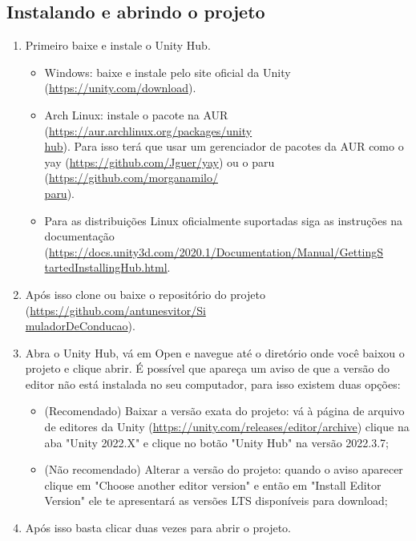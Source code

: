 \begin{apendicesenv}
\subsection*{Instalando e abrindo o projeto}

 \begin{enumerate}
    \item Primeiro baixe e instale o Unity Hub.
    \begin{itemize}
        \item Windows: baixe e instale pelo site oficial da Unity (\href{https://unity.com/download}{https://unity.com/download}).
        \item Arch Linux: instale o pacote na AUR (\href{https://aur.archlinux.org/packages/unityhub}{https://aur.archlinux.org/packages/unity\\hub}). Para isso terá que usar um gerenciador de pacotes da AUR como o yay (\href{https://github.com/Jguer/yay}{https://github.com/Jguer/yay}) ou o paru (\href{https://github.com/morganamilo/paru}{https://github.com/morganamilo/\\paru}).
        \item Para as distribuições Linux oficialmente suportadas siga as instruções na documentação (\href{https://docs.unity3d.com/2020.1/Documentation/Manual/GettingStartedInstallingHub.html}{https://docs.unity3d.com/2020.1/Documentation/Manual/GettingS\\tartedInstallingHub.html}.
    \end{itemize}
    \item Após isso clone ou baixe o repositório do projeto (\href{https://github.com/antunesvitor/SimuladorDeConducao}{https://github.com/antunesvitor/Si\\muladorDeConducao}).
    \item Abra o Unity Hub, vá em Open e navegue até o diretório onde você baixou o projeto e clique abrir. É possível que apareça um aviso de que a versão do editor não está instalada no seu computador, para isso existem duas opções:
    \begin{itemize}
        \item (Recomendado) Baixar a versão exata do projeto: vá à página de arquivo de editores da Unity (\href{https://unity.com/releases/editor/archive}{https://unity.com/releases/editor/archive}) clique na aba "Unity 2022.X"{} e clique no botão  "Unity Hub"{} na versão 2022.3.7;
        \item (Não recomendado) Alterar a versão do projeto: quando o aviso aparecer clique em "Choose another editor version"{} e então em "Install Editor Version"{} ele te apresentará as versões LTS disponíveis para download;
    \end{itemize}
    \item Após isso basta clicar duas vezes para abrir o projeto.
 \end{enumerate}


\end{apendicesenv}
